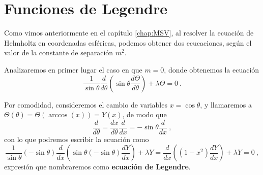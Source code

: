 \chapter{Funciones de Legendre}

Como vimos anteriormente en el capítulo \ref{chap:MSV}, al resolver la ecuación de Helmholtz en coordenadas esféricas, podemos obtener dos ecucaciones, según el valor de la constante de separación $m^2$. 

Analizaremos en primer lugar el caso en que $m=0$, donde obtenemos la ecuación
\begin{equation}
    \frac{1}{\sin\theta} \frac{d}{d\theta}\left( \sin\theta \frac{d\Theta}{d\theta} \right) + \lambda \Theta = 0 \ .
\end{equation}

Por comodidad, consideremos el cambio de variables $x = \cos\theta$, y llamaremos a $\Theta(\theta) = \Theta(\arccos(x)) = Y(x)$, de modo que
\begin{equation}
    \frac{d}{d\theta} = \frac{dx}{d\theta} \frac{d}{dx} = -\sin\theta \frac{d}{dx} \ ,
\end{equation}
con lo que podremos escribir la ecuación como
\begin{equation}
    \frac{1}{\sin\theta}(-\sin\theta)\frac{d}{dx}\left( \sin\theta (-\sin\theta) \frac{dY}{dx} \right) + \lambda Y = \frac{d}{dx}\left( (1-x^2) \frac{dY}{dx} \right) + \lambda Y = 0 \ ,
\end{equation}
expresión que nombraremos como \textbf{ecuación de Legendre}.